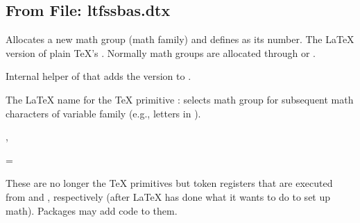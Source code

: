 \documentclass{l3in2edoc}
\begin{document}
%


\subsection{From File: ltfssbas.dtx}



\begin{function}[]
  {
    \new@mathgroup
  }
  \begin{syntax}
     
  \end{syntax}
  Allocates a new math group (math family) and defines  as
  its number. The \LaTeX{} version of plain \TeX's .
  Normally math groups are allocated through  or
  .
\end{function}



\begin{function}[int]
  {
    \new@mathversion
  }
  \begin{syntax}
     
  \end{syntax}
  Internal helper of  that adds the version to
  .
\end{function}



\begin{function}[]
  {
    \mathgroup
  }
  \begin{syntax}
     
  \end{syntax}
  The \LaTeX{} name for the \TeX{} primitive : selects math
  group  for subsequent math characters of variable
  family (e.g., letters in ).
\end{function}




\begin{function}[]
  {
    \everymath,
    \everydisplay
  }
  \begin{syntax}
    =
  \end{syntax}
  These are no longer the \TeX{} primitives but token registers that
  are executed from  and
  , respectively (after \LaTeX{} has done what
  it wants to do to set up math). Packages may add code to them.
\end{function}
\end{document}
